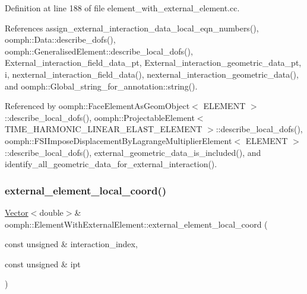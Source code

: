 Definition at line 188 of file element\+\_\+with\+\_\+external\+\_\+element.\+cc.



References assign\+\_\+external\+\_\+interaction\+\_\+data\+\_\+local\+\_\+eqn\+\_\+numbers(), oomph\+::\+Data\+::describe\+\_\+dofs(), oomph\+::\+Generalised\+Element\+::describe\+\_\+local\+\_\+dofs(), External\+\_\+interaction\+\_\+field\+\_\+data\+\_\+pt, External\+\_\+interaction\+\_\+geometric\+\_\+data\+\_\+pt, i, nexternal\+\_\+interaction\+\_\+field\+\_\+data(), nexternal\+\_\+interaction\+\_\+geometric\+\_\+data(), and oomph\+::\+Global\+\_\+string\+\_\+for\+\_\+annotation\+::string().



Referenced by oomph\+::\+Face\+Element\+As\+Geom\+Object$<$ E\+L\+E\+M\+E\+N\+T $>$\+::describe\+\_\+local\+\_\+dofs(), oomph\+::\+Projectable\+Element$<$ T\+I\+M\+E\+\_\+\+H\+A\+R\+M\+O\+N\+I\+C\+\_\+\+L\+I\+N\+E\+A\+R\+\_\+\+E\+L\+A\+S\+T\+\_\+\+E\+L\+E\+M\+E\+N\+T $>$\+::describe\+\_\+local\+\_\+dofs(), oomph\+::\+F\+S\+I\+Impose\+Displacement\+By\+Lagrange\+Multiplier\+Element$<$ E\+L\+E\+M\+E\+N\+T $>$\+::describe\+\_\+local\+\_\+dofs(), external\+\_\+geometric\+\_\+data\+\_\+is\+\_\+included(), and identify\+\_\+all\+\_\+geometric\+\_\+data\+\_\+for\+\_\+external\+\_\+interaction().

\mbox{\label{classoomph_1_1ElementWithExternalElement_a0f4b305e2da000ad7523ab02163c36cb}} 
\subsubsection{\texorpdfstring{external\+\_\+element\+\_\+local\+\_\+coord()}{external\_element\_local\_coord()}\hspace{0.1cm}{\footnotesize\ttfamily [1/2]}}
{\footnotesize\ttfamily \hyperlink{classoomph_1_1Vector}{Vector}$<$double$>$\& oomph\+::\+Element\+With\+External\+Element\+::external\+\_\+element\+\_\+local\+\_\+coord (\begin{DoxyParamCaption}\item[{const unsigned \&}]{interaction\+\_\+index,  }\item[{const unsigned \&}]{ipt }\end{DoxyParamCaption})\hspace{0.3cm}{\ttfamily [inline]}}



